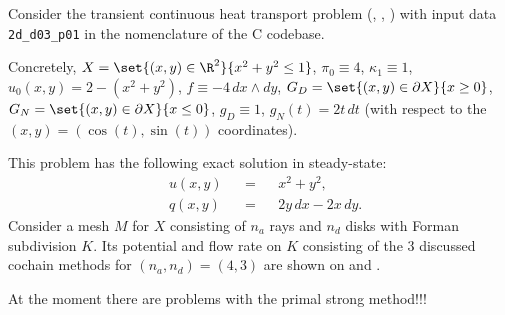 \begin{example}
  \label{cmc/diffusion/continuous/transient/examples/2d_d03_p01-example}
  Consider the transient continuous heat transport problem
  (,
   ,
   )
  with input data \verb|2d_d03_p01| in the nomenclature of the C codebase.

  Concretely,
    $X = \set{(x, y) \in \R^2}{x^2 + y^2 \leq 1}$,
    $\pi_0 \equiv 4$,
    $\kappa_1 \equiv 1$,
    $u_0(x, y) = 2 - (x^2 + y^2)$,
    $f \equiv -4\, d x \wedge d y$,
    $G_D = \set{(x, y) \in \partial X}{x \geq 0}$,
    $G_N = \set{(x, y) \in \partial X}{x \leq 0}$,
    $g_D \equiv 1$,
    $g_N(t) = 2 t \, d t$
    (with respect to the $(x, y) = (\cos(t), \sin(t))$ coordinates).

  This problem has the following exact solution in steady-state:
  \begin{subequations}
    \begin{alignat}{3}
      & u(x, y) && = && x^2 + y^2, \\
      & q(x, y) && = && 2 y\, d x - 2 x\, d y.
    \end{alignat}
  \end{subequations}
  Consider a mesh $M$ for $X$ consisting of $n_a$ rays and $n_d$ disks
  with Forman subdivision $K$.
  Its potential and flow rate on $K$ consisting of the $3$ discussed cochain
  methods for $(n_a, n_d) = (4, 3)$ are shown on
  and
  .

  {\color{red} At the moment there are problems with the primal strong
  method!!!}
\end{example}
